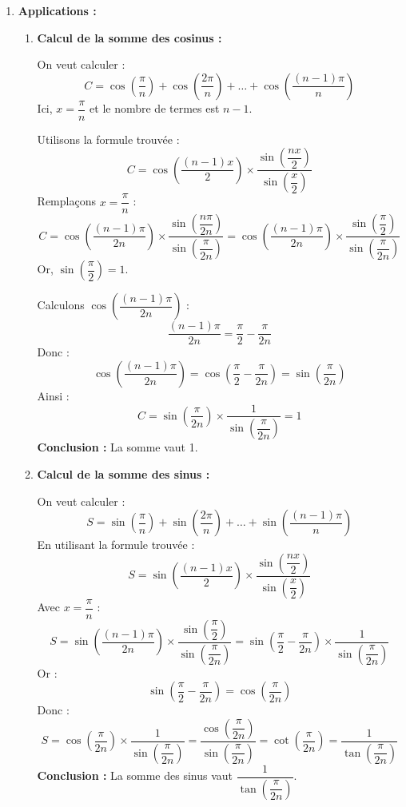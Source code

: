 \documentclass[a4paper,12pt]{article}
\begin{document}
\begin{solutionbox}
\begin{enumerate}
    \item \textbf{Applications :}

    \begin{enumerate}
        \item \textbf{Calcul de la somme des cosinus :}

        On veut calculer :
        \[
        C = \cos\left( \dfrac{\pi}{n} \right ) + \cos\left( \dfrac{2\pi}{n} \right ) + \dots + \cos\left( \dfrac{(n-1)\pi}{n} \right )
        \]
        Ici, \( x = \dfrac{\pi}{n} \) et le nombre de termes est \( n - 1 \).

        Utilisons la formule trouvée :
        \[
        C = \cos\left( \dfrac{(n - 1) x}{2} \right ) \times \dfrac{ \sin\left( \dfrac{n x}{2} \right ) }{ \sin\left( \dfrac{x}{2} \right ) }
        \]
        Remplaçons \( x = \dfrac{\pi}{n} \) :
        \[
        C = \cos\left( \dfrac{(n - 1) \pi}{2n} \right ) \times \dfrac{ \sin\left( \dfrac{n \pi}{2n} \right ) }{ \sin\left( \dfrac{\pi}{2n} \right ) } = \cos\left( \dfrac{(n - 1) \pi}{2n} \right ) \times \dfrac{ \sin\left( \dfrac{\pi}{2} \right ) }{ \sin\left( \dfrac{\pi}{2n} \right ) }
        \]
        Or, \( \sin\left( \dfrac{\pi}{2} \right ) = 1 \).

        Calculons \( \cos\left( \dfrac{(n - 1) \pi}{2n} \right ) \) :
        \[
        \dfrac{(n - 1) \pi}{2n} = \dfrac{\pi}{2} - \dfrac{\pi}{2n}
        \]
        Donc :
        \[
        \cos\left( \dfrac{(n - 1) \pi}{2n} \right ) = \cos\left( \dfrac{\pi}{2} - \dfrac{\pi}{2n} \right ) = \sin\left( \dfrac{\pi}{2n} \right )
        \]
        Ainsi :
        \[
        C = \sin\left( \dfrac{\pi}{2n} \right ) \times \dfrac{1}{ \sin\left( \dfrac{\pi}{2n} \right ) } = 1
        \]
        \textbf{Conclusion :} La somme vaut 1.

        \item \textbf{Calcul de la somme des sinus :}

        On veut calculer :
        \[
        S = \sin\left( \dfrac{\pi}{n} \right ) + \sin\left( \dfrac{2\pi}{n} \right ) + \dots + \sin\left( \dfrac{(n - 1)\pi}{n} \right )
        \]
        En utilisant la formule trouvée :
        \[
        S = \sin\left( \dfrac{(n - 1) x}{2} \right ) \times \dfrac{ \sin\left( \dfrac{n x}{2} \right ) }{ \sin\left( \dfrac{x}{2} \right ) }
        \]
        Avec \( x = \dfrac{\pi}{n} \) :
        \[
        S = \sin\left( \dfrac{(n - 1) \pi}{2n} \right ) \times \dfrac{ \sin\left( \dfrac{\pi}{2} \right ) }{ \sin\left( \dfrac{\pi}{2n} \right ) } = \sin\left( \dfrac{\pi}{2} - \dfrac{\pi}{2n} \right ) \times \dfrac{1}{ \sin\left( \dfrac{\pi}{2n} \right ) }
        \]
        Or :
        \[
        \sin\left( \dfrac{\pi}{2} - \dfrac{\pi}{2n} \right ) = \cos\left( \dfrac{\pi}{2n} \right )
        \]
        Donc :
        \[
        S = \cos\left( \dfrac{\pi}{2n} \right ) \times \dfrac{1}{ \sin\left( \dfrac{\pi}{2n} \right ) } = \dfrac{ \cos\left( \dfrac{\pi}{2n} \right ) }{ \sin\left( \dfrac{\pi}{2n} \right ) } = \cot\left( \dfrac{\pi}{2n} \right ) = \dfrac{1}{ \tan\left( \dfrac{\pi}{2n} \right ) }
        \]
        \textbf{Conclusion :} La somme des sinus vaut \( \dfrac{1}{ \tan\left( \dfrac{\pi}{2n} \right ) } \).


\end{enumerate}
\end{enumerate}
\end{solutionbox}
\end{document}
